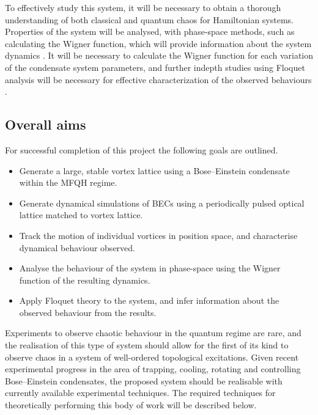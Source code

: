 To effectively study this system, it will be necessary to obtain a thorough understanding of both classical and quantum chaos for
Hamiltonian systems. Properties of the system will be analysed, with phase-space methods, such as calculating the Wigner function, which will provide information about the system dynamics \cite{CT:Gardiner_pra_2000}. It will be necessary to calculate the Wigner function for each variation of the condensate system parameters, and further indepth studies using Floquet analysis will be necessary for effective characterization of the observed behaviours \cite{CT:chu_physrep_2004,CT:McCaw_thesis_2005,CT:Gardiner_thesis_2000,CT:Kells_pre_2004}.

\subsection{Overall aims}
For successful completion of this project the following goals are outlined.
\begin{itemize}
	\item Generate a large, stable vortex lattice using a Bose--Einstein condensate within the MFQH regime.\vspace{-1em}
	\item Generate dynamical simulations of BECs using a periodically pulsed optical lattice matched to vortex lattice.\vspace{-1em}
	\item Track the motion of individual vortices in position space, and characterise dynamical behaviour observed.\vspace{-1em}
	\item Analyse the behaviour of the system in phase-space using the Wigner function of the resulting dynamics.\vspace{-1em}
	\item Apply Floquet theory to the system, and infer information about the observed behaviour from the results.
\end{itemize}
Experiments to observe chaotic behaviour in the quantum regime are rare, and the realisation of this type of system should allow for the first of its kind to observe chaos in a system of well-ordered topological excitations. Given recent experimental progress in the area of trapping, cooling, rotating and controlling Bose--Einstein condensates, the proposed system should be realisable with currently available experimental techniques.
The required techniques for theoretically performing this body of work will be described below.

